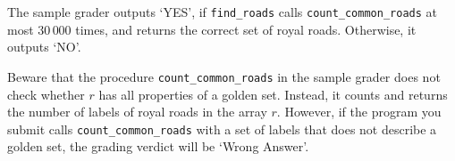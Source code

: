 The sample grader outputs `YES', if \texttt{find\_roads} calls \texttt{count\_common\_roads} at most $30\,000$ times, and returns the correct set of royal roads. Otherwise, it outputs `NO'.

Beware that the procedure \texttt{count\_common\_roads} in the sample grader does not check whether $r$ has all properties of a golden set. Instead, it counts and returns the number of labels of royal roads in the array $r$. However, if the program you submit calls \texttt{count\_common\_roads} with a set of labels that does not describe a golden set, the grading verdict  will be `Wrong Answer'.
